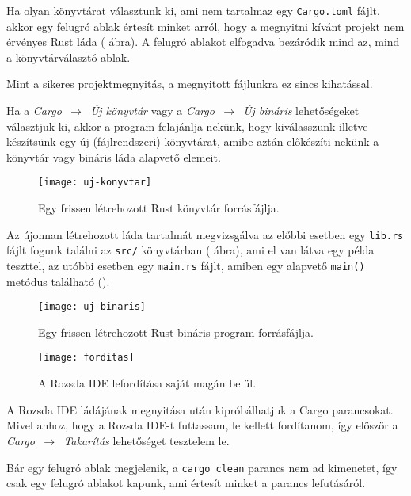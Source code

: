 Ha olyan könyvtárat választunk ki, ami nem tartalmaz egy \texttt{Cargo.toml} fájlt,
akkor egy felugró ablak értesít minket arról, hogy a megnyitni kívánt projekt nem
érvényes Rust láda ( ábra).
A felugró ablakot elfogadva bezáródik mind az, mind a könyvtárválasztó ablak.

Mint a sikeres projektmegnyitás, a megnyitott fájlunkra ez sincs kihatással.

Ha a \textit{Cargo $\,\to\,$ Új könyvtár} vagy a \textit{Cargo $\,\to\,$ Új bináris}
lehetőségeket választjuk ki, akkor a program felajánlja nekünk,
hogy kiválasszunk illetve készítsünk egy új (fájlrendszeri) könyvtárat,
amibe aztán előkészíti nekünk a könyvtár vagy bináris láda alapvető elemeit.

\begin{figure}[h]
    \centering
    \texttt{[image: uj-konyvtar]}
    \caption{Egy frissen létrehozott Rust könyvtár forrásfájlja.}
    \label{fig:uj-konyvtar}
\end{figure}

Az újonnan létrehozott láda tartalmát megvizsgálva az előbbi esetben egy \texttt{lib.rs}
fájlt fogunk találni az \texttt{src/} könyvtárban ( ábra), ami el van látva egy példa teszttel, 
az utóbbi esetben egy \texttt{main.rs} fájlt, amiben egy alapvető \texttt{main()} metódus található ().

\begin{figure}[h]
    \centering
    \texttt{[image: uj-binaris]}
    \caption{Egy frissen létrehozott Rust bináris program forrásfájlja.}
    \label{fig:uj-binaris}
\end{figure}

\newpage


\begin{figure}[h]
    \centering
    \texttt{[image: forditas]}
    \caption{A Rozsda IDE lefordítása saját magán belül.}
    \label{fig:forditas}
\end{figure}

A Rozsda IDE ládájának megnyitása után kipróbálhatjuk a Cargo parancsokat.
Mivel ahhoz, hogy a Rozsda IDE-t futtassam, le kellett fordítanom,
így először a \textit{Cargo $\,\to\,$ Takarítás} lehetőséget tesztelem le.

Bár egy felugró ablak megjelenik, a \texttt{cargo clean} parancs nem ad kimenetet,
így csak egy felugró ablakot kapunk, ami értesít minket a parancs lefutásáról.

